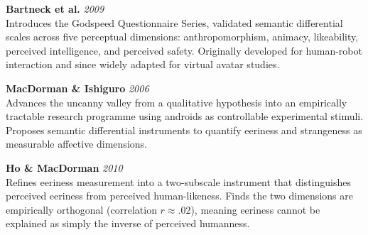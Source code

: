\documentclass[11pt]{article}
\newcommand{\entry}[3]{%
  \noindent\textbf{#1} \hfill \textit{#2}\\
  #3
  \vspace{0.9em}
  \par
}
\begin{document}
\entry{Bartneck et al.}{2009}{
Introduces the Godspeed Questionnaire Series, validated semantic differential scales across five perceptual dimensions: anthropomorphism, animacy, likeability, perceived intelligence, and perceived safety. Originally developed for human-robot interaction and since widely adapted for virtual avatar studies.
}

\entry{MacDorman \& Ishiguro}{2006}{
Advances the uncanny valley from a qualitative hypothesis into an empirically tractable research programme using androids as controllable experimental stimuli. Proposes semantic differential instruments to quantify eeriness and strangeness as measurable affective dimensions.
}

\entry{Ho \& MacDorman}{2010}{
Refines eeriness measurement into a two-subscale instrument that distinguishes perceived eeriness from perceived human-likeness. Finds the two dimensions are empirically orthogonal (correlation $r \approx .02$), meaning eeriness cannot be explained as simply the inverse of perceived humanness.
}
\end{document}
